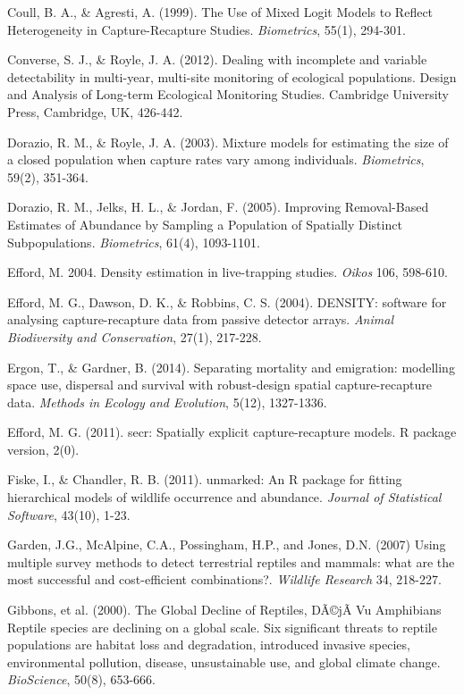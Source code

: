 \documentclass{book}
\begin{document}
\rf Coull, B. A., \& Agresti, A. (1999). The Use of Mixed Logit Models to Reflect Heterogeneity in Capture-Recapture Studies. \textit{Biometrics}, 55(1), 294-301.

\rf Converse, S. J., \& Royle, J. A. (2012). Dealing with incomplete and variable detectability in multi-year, multi-site monitoring of ecological populations. Design and Analysis of Long-term Ecological Monitoring Studies. Cambridge University Press, Cambridge, UK, 426-442.

\rf Dorazio, R. M., \& Royle, J. A. (2003). Mixture models for estimating the size of a closed population when capture rates vary among individuals. \textit{Biometrics}, 59(2), 351-364.

\rf Dorazio, R. M., Jelks, H. L., \& Jordan, F. (2005). Improving Removal-Based Estimates of Abundance by Sampling a Population of Spatially Distinct Subpopulations. \textit{Biometrics}, 61(4), 1093-1101.

\rf Efford, M. 2004. Density estimation in live-trapping studies. {\it Oikos}  106, 598-610.

\rf Efford, M. G., Dawson, D. K., \& Robbins, C. S. (2004). DENSITY: software for analysing capture-recapture data from passive detector arrays. \textit{Animal Biodiversity and Conservation}, 27(1), 217-228.

\rf Ergon, T., \& Gardner, B. (2014). Separating mortality and emigration: modelling space use, dispersal and survival with robust-design spatial capture-recapture data. \textit{Methods in Ecology and Evolution}, 5(12), 1327-1336.

\rf Efford, M. G. (2011). secr: Spatially explicit capture-recapture models. R package version, 2(0).

\rf Fiske, I., \& Chandler, R. B. (2011). unmarked: An R package for fitting hierarchical models of wildlife occurrence and abundance. \textit{Journal of Statistical Software}, 43(10), 1-23.

\rf Garden, J.G., McAlpine, C.A., Possingham, H.P., and Jones, D.N. (2007) Using multiple survey methods to detect terrestrial reptiles and mammals: what are the most successful and cost-efficient combinations?. \textit{Wildlife Research} 34, 218-227.

\rf Gibbons, et al. (2000). The Global Decline of Reptiles, DÃ©jÃ  Vu Amphibians Reptile species are declining on a global scale. Six significant threats to reptile populations are habitat loss and degradation, introduced invasive species, environmental pollution, disease, unsustainable use, and global climate change. \textit{BioScience}, 50(8), 653-666.
\end{document}
